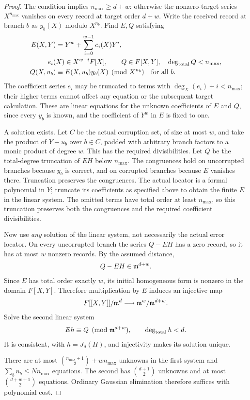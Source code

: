 \begin{proof}
The condition implies $n_{\max}\ge d+w$: otherwise the nonzero-target series
$X^{n_{\max}}$ vanishes on every record at target order $d+w$.
Write the received record at branch $b$ as $y_b(X)$ modulo $X^{n_b}$.
Find $E,Q$ satisfying
\[
 \begin{split}
 E(X,Y)&=Y^w+\sum_{i=0}^{w-1}e_i(X)Y^i,\\
 &\hspace{-12pt}e_i(X)\in X^{w-i}F[X],\qquad
 Q\in F[X,Y],\quad\deg_{\rm total}Q<n_{\max},\\
 Q(X,u_b)&\equiv E(X,u_b)y_b(X)\pmod {X^{n_b}}\quad\text{for all }b.
 \end{split}
\]
The coefficient series $e_i$ may be truncated to terms with
$\deg_X(e_i)+i<n_{\max}$; their higher terms cannot affect any equation or
the subsequent target calculation. These are linear equations for the
unknown coefficients of $E$ and $Q$, since every $y_b$ is known, and the
coefficient of $Y^w$ in $E$ is fixed to one.

A solution exists. Let $C$ be the actual corruption set, of size at most
$w$, and take the product of $Y-u_b$ over $b\in C$, padded with arbitrary
branch factors to a monic product of degree $w$. This has the required
divisibilities. Let $Q$ be the total-degree truncation of $EH$ below
$n_{\max}$. The congruences hold on uncorrupted branches because $y_b$ is
correct, and on corrupted branches because $E$ vanishes there. Truncation
preserves the congruences. The actual locator is a formal polynomial in $Y$;
truncate its coefficients as specified above to obtain the finite $E$ in
the linear system. The omitted terms have total order at least
$n_{\max}$, so this truncation preserves both the congruences and the
required coefficient divisibilities.

Now use \emph{any} solution of the linear system, not necessarily the actual
error locator. On every uncorrupted branch the series $Q-EH$ has a zero
record, so it has at most $w$ nonzero records. By the assumed distance,
\[
 Q-EH\in\mathfrak m^{d+w}.
\]
Since $E$ has total order exactly $w$, its initial homogeneous form is
nonzero in the domain $F[X,Y]$. Therefore multiplication by $E$ induces an
injective map
\[
 F[[X,Y]]/\mathfrak m^d\longrightarrow
   \mathfrak m^w/\mathfrak m^{d+w}.
\]
Solve the second linear system
\[
 E h\equiv Q\pmod {\mathfrak m^{d+w}},\qquad\deg_{\rm total}h<d.
\]
It is consistent, with $h=J_d(H)$, and injectivity makes its solution unique.

There are at most $\binom{n_{\max}+1}{2}+wn_{\max}$ unknowns in the first
system and $\sum_b n_b\le Nn_{\max}$ equations. The second has
$\binom{d+1}{2}$ unknowns and at most $\binom{d+w+1}{2}$ equations.
Ordinary Gaussian elimination therefore suffices with polynomial cost.
\end{proof}


